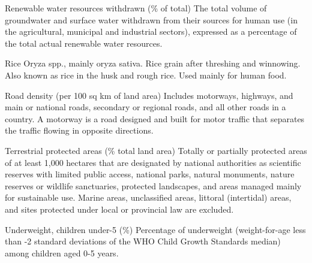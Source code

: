 \begin{MetadataCollection} {}
\begin{metadata}{Renewable water resources withdrawn (\% of total)} {}
The total volume of groundwater and surface water withdrawn from their sources for human use (in the agricultural, municipal and industrial sectors), expressed as a percentage of the total actual renewable water resources.
\end{metadata}

\begin{metadata}{Rice} {}
Oryza spp., mainly oryza sativa.  Rice grain after threshing and winnowing. Also known as rice in the husk and rough rice. Used mainly for human food.
\end{metadata}

\begin{metadata}{Road density (per 100 sq km of land area)} {}
Includes motorways, highways, and main or national roads, secondary or regional roads, and all other roads in a country. A motorway is a road designed and built for motor traffic that separates the traffic flowing in opposite directions.
\end{metadata}

\begin{metadata}{Terrestrial protected areas (\% total land area)} {}
Totally or partially protected areas of at least 1,000 hectares that are designated by national authorities as scientific reserves with limited public access, national parks, natural monuments, nature reserves or wildlife sanctuaries, protected landscapes, and areas managed mainly for sustainable use. Marine areas, unclassified areas, littoral (intertidal) areas, and sites protected under local or provincial law are excluded.
\end{metadata}

\begin{metadata}{Underweight, children under-5 (\%)} {}
Percentage of underweight (weight-for-age less than -2 standard deviations of the WHO Child Growth Standards median) among children aged 0-5 years.
\end{metadata}


\end{MetadataCollection}
